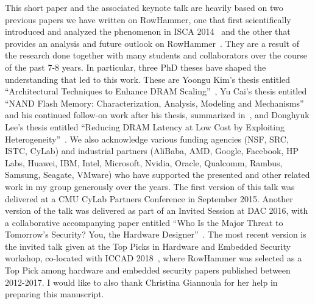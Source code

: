 \documentclass[runningheads]{llncs}
\begin{document}
This short paper and the associated keynote talk are heavily based on
two previous papers we have written on RowHammer, one that first
scientifically introduced and analyzed the phenomenon in ISCA 2014~\cite{rowhammer-isca2014} and
the other that provides an analysis and future outlook on
RowHammer~\cite{onur-date17}. They are a result of the research done
together with many students and collaborators over the course of the
past 7-8 years. In particular, three PhD theses have shaped the
understanding that led to this work. These are Yoongu Kim's thesis
entitled ``Architectural Techniques to Enhance DRAM
Scaling''~\cite{yoongu-thesis}, Yu Cai's thesis entitled ``NAND Flash
Memory: Characterization, Analysis, Modeling and
Mechanisms''~\cite{yucai-thesis} and his continued follow-on work
after his thesis, summarized in~\cite{cai2017errors,cai2017error}, and
Donghyuk Lee's thesis entitled ``Reducing DRAM Latency at Low Cost by
Exploiting Heterogeneity''~\cite{donghyuk-thesis-arxiv16}. We also
acknowledge various funding agencies (NSF, SRC, ISTC, CyLab) and
industrial partners (AliBaba, AMD, Google, Facebook, HP Labs, Huawei,
IBM, Intel, Microsoft, Nvidia, Oracle, Qualcomm, Rambus, Samsung,
Seagate, VMware) who have supported the presented and other related
work in my group generously over the years. The first version of this
talk was delivered at a CMU CyLab Partners Conference in September
2015. Another version of the talk was delivered as part of an Invited
Session at DAC 2016, with a collaborative accompanying paper entitled
``Who Is the Major Threat to Tomorrow’s Security? You, the Hardware
Designer''~\cite{dac-invited-paper16}. The most recent version is the
invited talk given at the Top Picks in Hardware and Embedded Security
workshop, co-located with ICCAD 2018~\cite{topinhes-workshop-url},
where RowHammer was selected as a Top Pick among hardware and embedded
security papers published between 2012-2017. I would like to also
thank Christina Giannoula for her help in preparing this manuscript.







\end{document}
